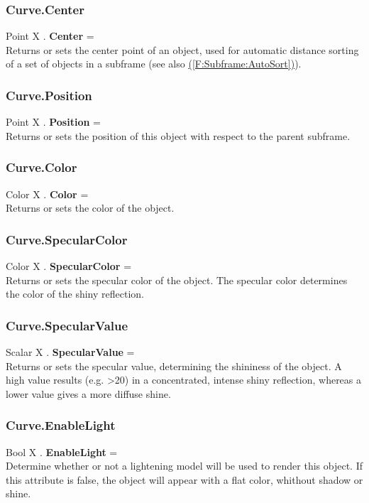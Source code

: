 \documentclass[10pt]{book}
\newcommand{\linkitem}[1]{\hyperref[#1]{\nameref{#1} (\ref{#1})}}
\begin{document}
\subsubsection{Curve.Center \label{F:Curve:Center}}
Point X . \textbf{Center} = \\
Returns or sets the center point of an object, used for automatic distance sorting of a set of objects in a subframe (see also \linkitem{F:Subframe:AutoSort}).

\subsubsection{Curve.Position \label{F:Curve:Position}}
Point X . \textbf{Position} = \\
Returns or sets the position of this object with respect to the parent subframe.

\subsubsection{Curve.Color \label{F:Curve:Color}}
Color X . \textbf{Color} = \\
Returns or sets the color of the object.

\subsubsection{Curve.SpecularColor \label{F:Curve:SpecularColor}}
Color X . \textbf{SpecularColor} = \\
Returns or sets the specular color of the object. The specular color determines the color of the shiny reflection.

\subsubsection{Curve.SpecularValue \label{F:Curve:SpecularValue}}
Scalar X . \textbf{SpecularValue} = \\
Returns or sets the specular value, determining the shininess of the object. A high value results (e.g. >20) in a concentrated, intense shiny reflection, whereas a lower value gives a more diffuse shine.

\subsubsection{Curve.EnableLight \label{F:Curve:EnableLight}}
Bool X . \textbf{EnableLight} = \\
Determine whether or not a lightening model will be used to render this object. If this attribute is false, the object will appear with a flat color, whithout shadow or shine.
\end{document}

